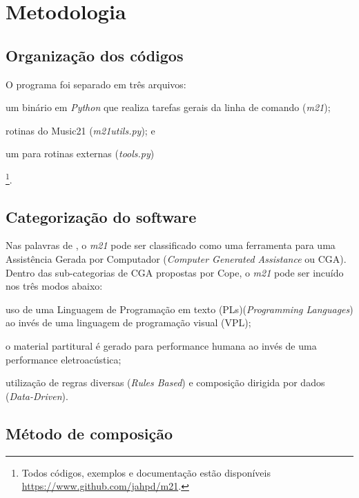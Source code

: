 \section{Metodologia}\label{sec:metodo}

\subsection*{Organização dos códigos}

O programa foi separado em três arquivos: \begin{inparaenum}
\item um binário em \emph{Python} que realiza tarefas gerais da linha de comando (\emph{m21});
\item rotinas do Music21 (\emph{m21utils.py}); e 
\item um para rotinas externas (\emph{tools.py})
\end{inparaenum}\footnote{Todos códigos, exemplos e documentação estão disponíveis \url{https://www.github.com/jahpd/m21}.}.

\subsection*{Categorização do software}

Nas palavras de \cite[p.~x-xiii]{cope_prefacio_2008}, o \emph{m21} pode ser classificado como uma ferramenta para uma Assistência Gerada por Computador (\emph{Computer Generated Assistance} ou CGA). Dentro das sub-categorias de CGA propostas por Cope, o \emph{m21} pode ser incuído nos três modos abaixo:\begin{inparaenum}
\item uso de uma Linguagem de Programação em texto (PLs)(\emph{Programming Languages}) ao invés de uma linguagem de programação visual (VPL); 
\item o material partitural é gerado para performance humana ao invés de uma performance eletroacústica;
\item utilização de regras diversas (\emph{Rules Based}) e composição dirigida por dados (\emph{Data-Driven}).
\end{inparaenum}

\subsection*{Método de composição}\label{sec:metodo_composicao}

